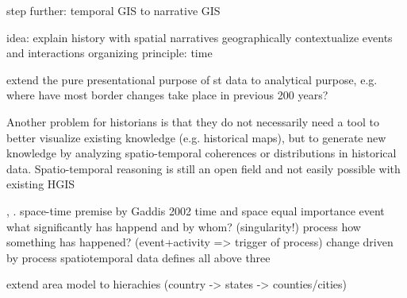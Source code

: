 step further: temporal GIS to narrative GIS

idea: explain history with spatial narratives
  geographically contextualize events and interactions
  organizing principle: time

extend the pure presentational purpose of st data to analytical purpose, e.g. where have most border changes take place in previous 200 years?

Another problem for historians is that they do not necessarily need a tool to better visualize existing knowledge (e.g. historical maps), but to generate new knowledge by analyzing spatio-temporal coherences or distributions in historical data. Spatio-temporal reasoning is still an open field and not easily possible with existing HGIS

\cite[p. 268]{knowles2008placing}, \cite[p. xii]{gregory2014toward}.
space-time premise by Gaddis 2002
  time and space equal importance
  event     what significantly has happend and by whom? (singularity!)
  process   how something has happened? (event+activity => trigger of process)
  change    driven by process
  spatiotemporal data defines all above three

extend area model to hierachies (country -> states -> counties/cities)




